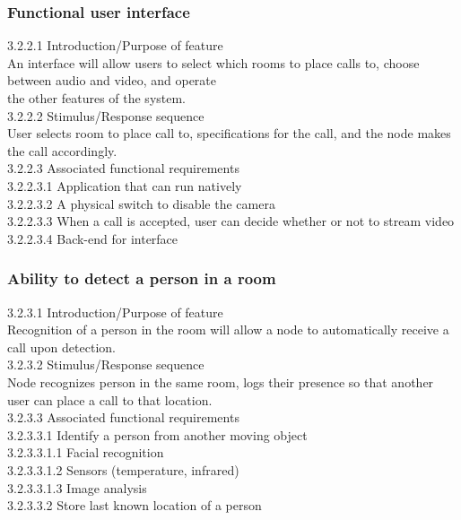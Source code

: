 \documentclass[onecolumn, draftclsnofoot,10pt, compsoc]{IEEEtran}
\newcommand\tab[1][1cm]{\hspace*{#1}}
\begin{document}
\subsubsection{Functional user interface}
\tab 3.2.2.1  Introduction/Purpose of feature \\
\tab An interface will allow users to select which rooms to place calls to, choose between audio and video, and operate \\ \tab the other features of the system. \\
\tab 3.2.2.2  Stimulus/Response sequence \\
\tab User selects room to place call to, specifications for the call, and the node makes the call accordingly. \\
\tab 3.2.2.3  Associated functional requirements \\
\tab \tab 3.2.2.3.1  Application that can run natively \\
\tab \tab 3.2.2.3.2  A physical switch to disable the camera \\
\tab \tab 3.2.2.3.3  When a call is accepted, user can decide whether or not to stream video \\ 
\tab \tab 3.2.2.3.4  Back-end for interface 

\subsubsection{Ability to detect a person in a room}
\tab 3.2.3.1  Introduction/Purpose of feature \\
\tab Recognition of a person in the room will allow a node to automatically receive a call upon detection. \\
\tab 3.2.3.2  Stimulus/Response sequence \\
\tab Node recognizes person in the same room, logs their presence so that another user can place a call to that location. \\
\tab 3.2.3.3  Associated functional requirements \\
\tab \tab 3.2.3.3.1  Identify a person from another moving object \\
\tab \tab \tab 3.2.3.3.1.1  Facial recognition \\
\tab \tab \tab 3.2.3.3.1.2  Sensors (temperature, infrared) \\
\tab \tab \tab 3.2.3.3.1.3  Image analysis \\ 
\tab \tab 3.2.3.3.2  Store last known location of a person
\end{document}
